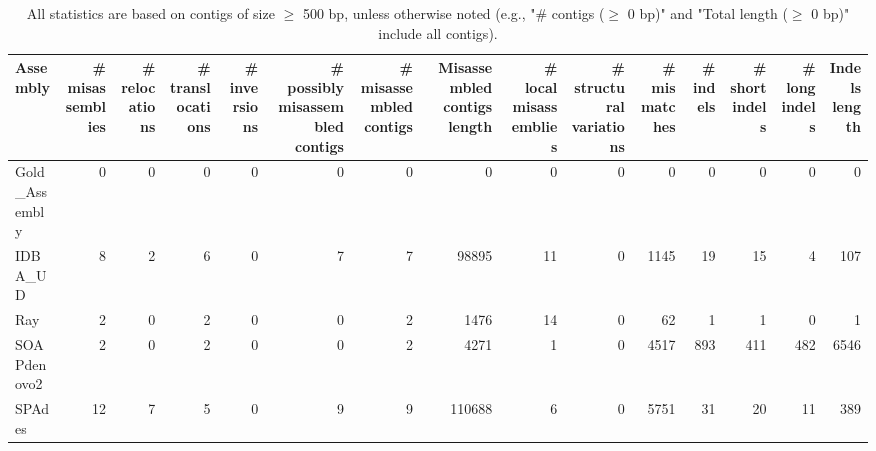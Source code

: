 \documentclass[12pt,a4paper]{article}
\begin{document}
\begin{table}[ht]
\begin{center}
\caption{All statistics are based on contigs of size $\geq$ 500 bp, unless otherwise noted (e.g., "\# contigs ($\geq$ 0 bp)" and "Total length ($\geq$ 0 bp)" include all contigs).}
\begin{tabular}{|l*{14}{|r}|}
\hline
Assembly & \# misassemblies &     \# relocations &     \# translocations &     \# inversions & \# possibly misassembled contigs & \# misassembled contigs & Misassembled contigs length & \# local misassemblies & \# structural variations & \# mismatches & \# indels &     \# short indels &     \# long indels & Indels length \\ \hline
Gold\_Assembly & 0 & 0 & 0 & 0 & 0 & 0 & 0 & 0 & 0 & 0 & 0 & 0 & 0 & 0 \\ \hline
IDBA\_UD & 8 & 2 & 6 & 0 & 7 & 7 & 98895 & 11 & 0 & 1145 & 19 & 15 & 4 & 107 \\ \hline
Ray & 2 & 0 & 2 & 0 & 0 & 2 & 1476 & 14 & 0 & 62 & 1 & 1 & 0 & 1 \\ \hline
SOAPdenovo2 & 2 & 0 & 2 & 0 & 0 & 2 & 4271 & 1 & 0 & 4517 & 893 & 411 & 482 & 6546 \\ \hline
SPAdes & 12 & 7 & 5 & 0 & 9 & 9 & 110688 & 6 & 0 & 5751 & 31 & 20 & 11 & 389 \\ \hline
\end{tabular}
\end{center}
\end{table}
\end{document}
